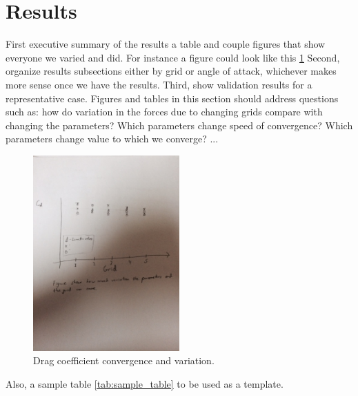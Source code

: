 
\section{Results}
First executive summary of the results a table and couple figures that show everyone we varied and did. For instance a figure could look like this \cref{fig:Cd_convergence}
Second, organize results subsections either by grid or angle of attack, whichever makes more sense once we have the results.
Third, show validation results for a representative case.
Figures and tables in this section should address questions such as: how do variation in the forces due to changing grids compare with changing the parameters? Which parameters change speed of convergence? Which parameters change value to which we converge? ...

\begin{figure}
  \centering
  \includegraphics[width=0.5\textwidth]{./fig/cd_convergence}
  \caption{Drag coefficient convergence and variation.}
  \label{fig:Cd_convergence}
\end{figure}

Also, a sample table \cref{tab:sample_table} to be used as a template.

